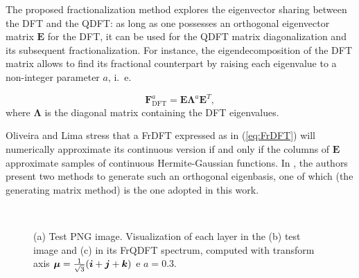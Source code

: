 The proposed fractionalization method explores the eigenvector sharing between the DFT and the QDFT: as long as one possesses an orthogonal eigenvector matrix $ \mathbf{E} $ for the DFT, it can be used for the QDFT matrix diagonalization and its subsequent fractionalization. For instance, the eigendecomposition of the DFT matrix allows to find its fractional counterpart by raising each eigenvalue to a non-integer parameter $ a $, i.~e.

\begin{equation}
\label{eq:FrDFT}
\mathbf{F}_{\text{DFT}}^a = \mathbf{E} \mathbf{\Lambda}^a \mathbf{E}^T,
\end{equation}
where $ \mathbf{\Lambda} $ is the diagonal matrix containing the DFT eigenvalues.

Oliveira and Lima \cite{de2017discrete} stress that a FrDFT expressed as in (\ref{eq:FrDFT}) will numerically approximate its continuous version if and only if the columns of $ \mathbf{E} $ approximate samples of continuous Hermite-Gaussian functions. In \cite{de2017discrete}, the authors present two methods to generate such an orthogonal eigenbasis, one of which (the generating matrix method) is the one adopted in this work.

\begin{figure}
\centering
{}~
~
~
\caption{(a) Test PNG image. Visualization of each layer in the (b) test image and (c) in its FrQDFT spectrum, computed with transform axis $ \boldsymbol{\mu} = \frac{1}{\sqrt{3}}(\boldsymbol{i} + \boldsymbol{j} + \boldsymbol{k}) $ e $ a=0{.}3 $.}
\end{figure}

